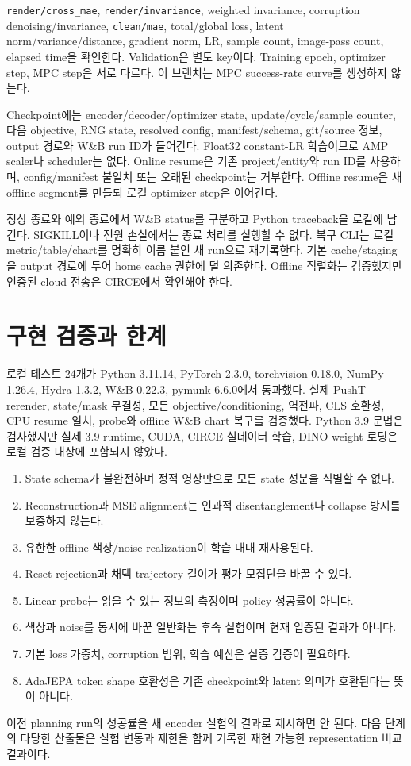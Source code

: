\documentclass[11pt,a4paper]{article}
\newcommand{\code}[1]{\nolinkurl{#1}}
\begin{document}
\code{render/cross_mae}, \code{render/invariance}, weighted invariance,
corruption denoising/invariance, \code{clean/mae}, total/global loss,
latent norm/variance/distance, gradient norm, LR, sample count,
image-pass count, elapsed time을 확인한다. Validation은 별도 key이다.
Training epoch, optimizer step, MPC step은 서로 다르다. 이 브랜치는
MPC success-rate curve를 생성하지 않는다.

Checkpoint에는 encoder/decoder/optimizer state, update/cycle/sample counter,
다음 objective, RNG state, resolved config, manifest/schema, git/source 정보,
output 경로와 W\&B run ID가 들어간다. Float32 constant-LR 학습이므로 AMP scaler나
scheduler는 없다. Online resume은 기존 project/entity와 run ID를 사용하며,
config/manifest 불일치 또는 오래된 checkpoint는 거부한다. Offline resume은
새 offline segment를 만들되 로컬 optimizer step은 이어간다.

정상 종료와 예외 종료에서 W\&B status를 구분하고 Python traceback을 로컬에 남긴다.
SIGKILL이나 전원 손실에서는 종료 처리를 실행할 수 없다. 복구 CLI는 로컬
metric/table/chart를 명확히 이름 붙인 새 run으로 재기록한다.
기본 cache/staging을 output 경로에 두어 home cache 권한에 덜 의존한다.
Offline 직렬화는 검증했지만 인증된 cloud 전송은 CIRCE에서 확인해야 한다.

\section{구현 검증과 한계}
로컬 테스트 24개가 Python 3.11.14, PyTorch 2.3.0, torchvision 0.18.0,
NumPy 1.26.4, Hydra 1.3.2, W\&B 0.22.3, pymunk 6.6.0에서 통과했다.
실제 PushT rerender, state/mask 무결성, 모든 objective/conditioning,
역전파, CLS 호환성, CPU resume 일치, probe와 offline W\&B chart 복구를 검증했다.
Python 3.9 문법은 검사했지만 실제 3.9 runtime, CUDA, CIRCE 실데이터 학습,
DINO weight 로딩은 로컬 검증 대상에 포함되지 않았다.

\begin{enumerate}
\item State schema가 불완전하며 정적 영상만으로 모든 state 성분을 식별할 수 없다.
\item Reconstruction과 MSE alignment는 인과적 disentanglement나 collapse 방지를 보증하지 않는다.
\item 유한한 offline 색상/noise realization이 학습 내내 재사용된다.
\item Reset rejection과 채택 trajectory 길이가 평가 모집단을 바꿀 수 있다.
\item Linear probe는 읽을 수 있는 정보의 측정이며 policy 성공률이 아니다.
\item 색상과 noise를 동시에 바꾼 일반화는 후속 실험이며 현재 입증된 결과가 아니다.
\item 기본 loss 가중치, corruption 범위, 학습 예산은 실증 검증이 필요하다.
\item AdaJEPA token shape 호환성은 기존 checkpoint와 latent 의미가 호환된다는 뜻이 아니다.
\end{enumerate}
이전 planning run의 성공률을 새 encoder 실험의 결과로 제시하면 안 된다.
다음 단계의 타당한 산출물은 실험 변동과 제한을 함께 기록한 재현 가능한
representation 비교 결과이다.
\end{document}
